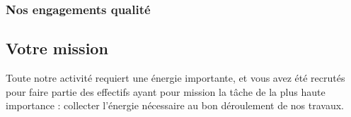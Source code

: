 \subsubsection{Nos engagements qualité}

\subsection{Votre mission}

Toute notre activité requiert une énergie importante, et vous avez été recrutés
pour faire partie des effectifs ayant pour mission la tâche de la plus haute
importance : collecter l'énergie nécessaire au bon déroulement de nos travaux.
